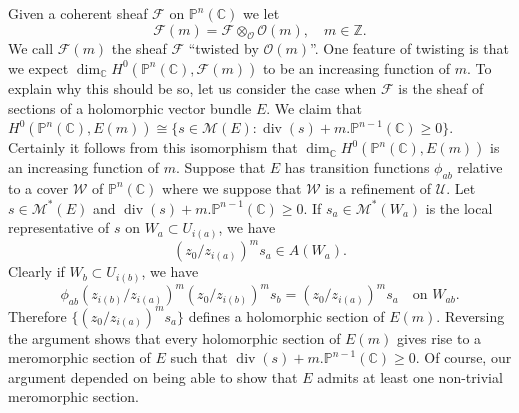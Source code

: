 Given a coherent sheaf $\mathcal F$ on $\mathbb P^n(\mathbb C)$ we let
\[
\mathcal F(m)=\mathcal F\otimes_{\mathcal O}\mathcal O(m),\quad m\in\mathbb Z.
\]
We call $\mathcal F(m)$ the sheaf $\mathcal F$ ``twisted by $\mathcal O(m)$''. One feature of twisting is that we expect $\dim_{\mathbb C}H^0(\mathbb P^n(\mathbb C),\mathcal F(m))$ to be an increasing function of $m$. To explain why this should be so, let us consider the case when $\mathcal F$ is the sheaf of sections of a holomorphic vector bundle $E$. We claim that $H^0(\mathbb P^n(\mathbb C),E(m))\cong\{s\in\mathcal M(E):\operatorname{div}(s)+m.\mathbb P^{n-1}(\mathbb C)\geq0\}$. Certainly it follows from this isomorphism that $\dim_{\mathbb C}H^0(\mathbb P^n(\mathbb C),E(m))$ is an increasing function of $m$. Suppose that $E$ has transition functions $\phi_{ab}$ relative to a cover $\mathcal W$ of $\mathbb P^n(\mathbb C)$ where we suppose that $\mathcal W$ is a refinement of $\mathcal U$. Let $s\in\mathcal M^*(E)$ and $\operatorname{div}(s)+m.\mathbb P^{n-1}(\mathbb C)\geq0$. If $s_a\in\mathcal M^*(W_a)$ is the local representative of $s$ on $W_a\subset U_{i(a)}$, we have
\[
(z_0/z_{i(a)})^ms_a\in A(W_a).
\]
Clearly if $W_b\subset U_{i(b)}$, we have
\[
\phi_{ab}(z_{i(b)}/z_{i(a)})^m(z_0/z_{i(b)})^ms_b=(z_0/z_{i(a)})^ms_a\quad\text{on }W_{ab}.
\]
Therefore $\{(z_0/z_{i(a)})^ms_a\}$ defines a holomorphic section of $E(m)$. Reversing the argument shows that every holomorphic section of $E(m)$ gives rise to a meromorphic section of $E$ such that $\operatorname{div}(s)+m.\mathbb P^{n-1}(\mathbb C)\geq0$. Of course, our argument depended on being able to show that $E$ admits at least one non-trivial meromorphic section.

